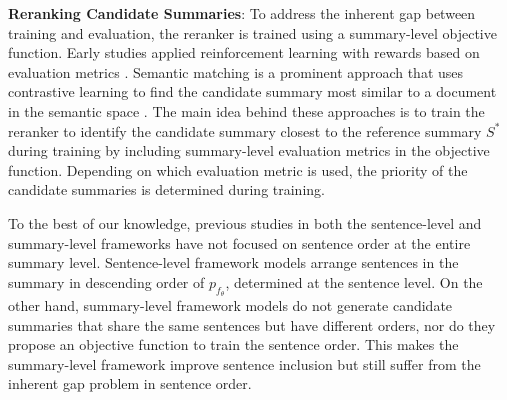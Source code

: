 \noindent
\textbf{Reranking Candidate Summaries}: To address the inherent gap between training and evaluation, the reranker is trained using a summary-level objective function. Early studies applied reinforcement learning with rewards based on evaluation metrics \citep{narayan-etal-2018-ranking, bae-etal-2019-summary, dong-etal-2018-banditsum}. Semantic matching is a prominent approach that uses contrastive learning \citep{oord2019representationlearningcontrastivepredictive} to find the candidate summary most similar to a document in the semantic space \citep{zhong-etal-2020-extractive, liu-liu-2021-simcls, an-etal-2022-colo, zhang-etal-2023-diffusum}. The main idea behind these approaches is to train the reranker to identify the candidate summary closest to the reference summary $S^*$ during training by including summary-level evaluation metrics in the objective function. Depending on which evaluation metric is used, the priority of the candidate summaries is determined during training.

To the best of our knowledge, previous studies in both the sentence-level and summary-level frameworks have not focused on sentence order at the entire summary level. Sentence-level framework models arrange sentences in the summary in descending order of $p_{f_{\theta}}$, determined at the sentence level. On the other hand, summary-level framework models do not generate candidate summaries that share the same sentences but have different orders, nor do they propose an objective function to train the sentence order. This makes the summary-level framework improve sentence inclusion but still suffer from the inherent gap problem in sentence order.

